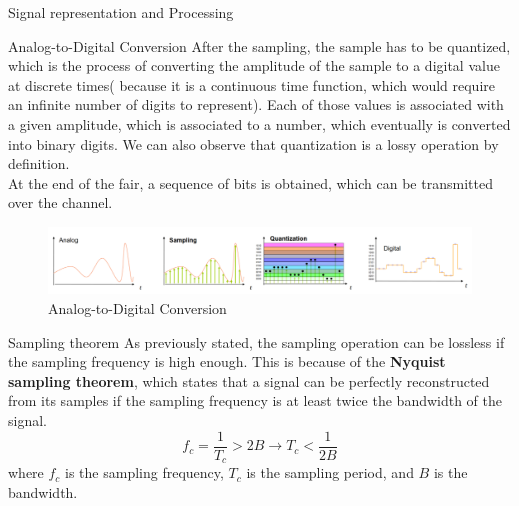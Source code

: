 \begin{section}{Signal representation and Processing}
\begin{subsection}{Analog-to-Digital Conversion}
      After the sampling, the sample has to be quantized, which is the process of converting the
      amplitude of the sample to a digital value at discrete times( because it is a continuous
      time function, which would require an infinite number of digits to represent). Each of those 
      values is associated with a given amplitude, which is associated to a number, which 
      eventually is converted into binary digits. We can also observe that quantization is a lossy
      operation by definition.\\
      At the end of the fair, a sequence of bits is obtained, which can be transmitted over the
      channel.\\
      \begin{figure}[h]
        \centering
        \includegraphics[width=\textwidth]{img/analog to digital.png}
        \caption{Analog-to-Digital Conversion}
        \label{fig:ADC}
      \end{figure}
      \begin{subsubsection}{Sampling theorem}
        As previously stated, the sampling operation can be lossless if the sampling frequency is
        high enough. This is because of the \textbf{Nyquist sampling theorem}, which states
        that a signal can be perfectly reconstructed from its samples if the sampling frequency is
        at least twice the bandwidth of the signal.\\
        \begin{equation}
          f_c=\frac{1}{T_c}>2B\to T_c<\frac{1}{2B}
        \end{equation}
        where $f_c$ is the sampling frequency, $T_c$ is the sampling period, and $B$ is the bandwidth.
        \end{subsubsection}
    \end{subsection}
\end{section}

